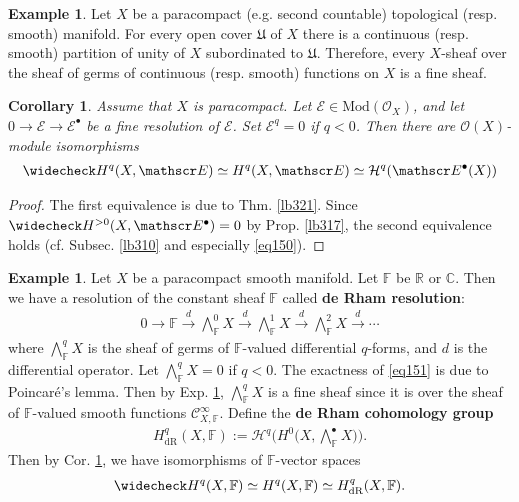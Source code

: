 \documentclass[12pt,b5paper,notitlepage]{report}
\theoremstyle{definition}
\newtheorem{eg}[df]{Example}
\theoremstyle{plain}
\newtheorem{co}[df]{Corollary}
\newcommand{\fk}{\mathfrak}
\newcommand{\mc}{\mathcal}
\newcommand{\wch}{\widecheck}
\newcommand{\scr}{\mathscr}
\newcommand{\blt}{\bullet}
\newcommand{\Cbb}{\mathbb C}
\newcommand{\Rbb}{\mathbb R}
\newcommand{\Mod}{\mathrm{Mod}}
\newcommand{\Fbb}{\mathbb F}
\numberwithin{equation}{section}
\begin{document}
\begin{eg}\label{lb325}
Let $X$ be a paracompact (e.g. second countable)  topological (resp. smooth) manifold. For every open cover $\fk U$ of $X$ there is a continuous (resp. smooth) partition of unity of $X$ subordinated to $\fk U$. Therefore, every $X$-sheaf over the sheaf of germs of continuous (resp. smooth) functions on $X$ is a fine sheaf.
\end{eg}


\begin{co}\label{lb322}
Assume that $X$ is paracompact. Let $\scr E\in\Mod(\scr O_X)$, and let $0\rightarrow\scr E\rightarrow\scr E^\blt$ be a fine resolution of $\scr E$. Set $\scr E^q=0$ if $q<0$. Then there are $\scr O(X)$-module isomorphisms
\begin{align*}
\wch H^q(X,\scr E)\simeq H^q(X,\scr E)\simeq \mc H^q(\scr E^\blt(X))
\end{align*}
\end{co}


\begin{proof}
The first equivalence is due to Thm. \ref{lb321}. Since $\wch H^{>0}(X,\scr E^\blt)=0$ by Prop. \ref{lb317}, the second equivalence holds (cf. Subsec. \ref{lb310} and especially \eqref{eq150}).
\end{proof}











\begin{eg}
Let $X$ be a paracompact smooth manifold. Let $\Fbb$ be $\Rbb$ or $\Cbb$. Then we have a resolution of the constant sheaf $\Fbb$ called \textbf{de Rham resolution}:  
\begin{align}
0\rightarrow\Fbb\xrightarrow{d} \bigwedge\nolimits^0_\Fbb X\xrightarrow{d} \bigwedge\nolimits^1_\Fbb X \xrightarrow{d} \bigwedge\nolimits^2_\Fbb X\xrightarrow{d}\cdots  \label{eq151}
\end{align}
where $\bigwedge^q_\Fbb X$ is the sheaf of germs of $\Fbb$-valued differential $q$-forms, and $d$ is the differential operator. Let $\bigwedge^q_\Fbb X=0$ if $q<0$. The exactness of \eqref{eq151} is due to Poincar\'e's lemma. Then by Exp. \ref{lb325}, $\bigwedge^q_\Fbb X$ is a fine sheaf since it is over the sheaf of $\Fbb$-valued smooth functions $\scr C^\infty_{X,\Fbb}$. Define the \textbf{de Rham cohomology group} \index{00@De Rham cohomology $H^q_{\mathrm{dR}}(X,\Fbb)$}
\begin{align}
H^q_{\mathrm{dR}}(X,\Fbb):=\mc H^q\Big(H^0\big(X,\bigwedge\nolimits^\blt_\Fbb X\big)\Big).
\end{align}
Then by Cor. \ref{lb322}, we have isomorphisms of $\Fbb$-vector spaces
\begin{align*}
\wch H^q(X,\Fbb)\simeq H^q(X,\Fbb)\simeq H^q_{\mathrm{dR}}(X,\Fbb).
\end{align*}
\end{eg}
\end{document}

